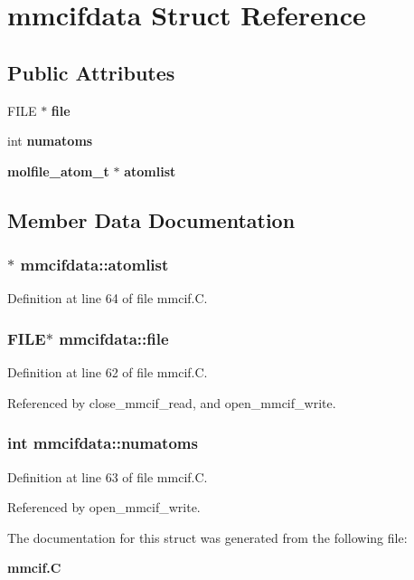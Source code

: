 \section{mmcifdata  Struct Reference}
\label{structmmcifdata}
\subsection*{Public Attributes}
\begin{CompactItemize}
\item 
FILE $\ast$ {\bf file}
\item 
int {\bf numatoms}
\item 
{\bf molfile\_\-atom\_\-t} $\ast$ {\bf atomlist}
\end{CompactItemize}


\subsection{Member Data Documentation}
\subsubsection{$\ast$ mmcifdata::atomlist}\label{structmmcifdata_m2}




Definition at line 64 of file mmcif.C.
\subsubsection{\setlength{\rightskip}{0pt plus 5cm}FILE$\ast$ mmcifdata::file}\label{structmmcifdata_m0}




Definition at line 62 of file mmcif.C.

Referenced by close\_\-mmcif\_\-read, and open\_\-mmcif\_\-write.
\subsubsection{\setlength{\rightskip}{0pt plus 5cm}int mmcifdata::numatoms}\label{structmmcifdata_m1}




Definition at line 63 of file mmcif.C.

Referenced by open\_\-mmcif\_\-write.

The documentation for this struct was generated from the following file:\begin{CompactItemize}
\item 
{\bf mmcif.C}\end{CompactItemize}
